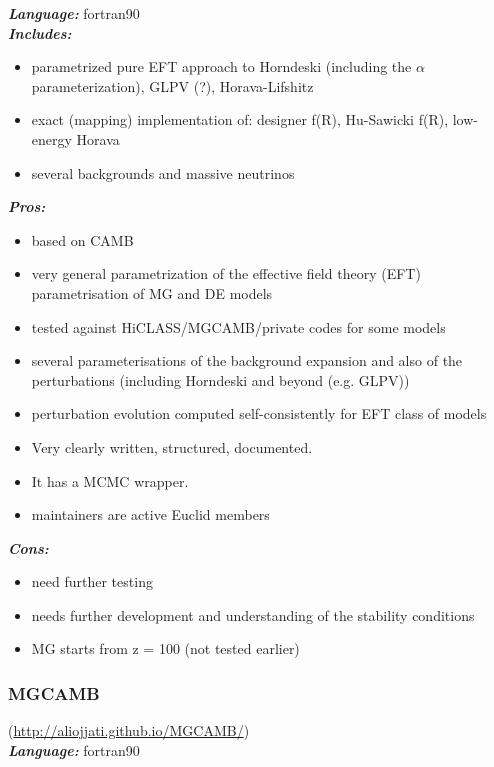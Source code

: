 {\it \bf Language:} fortran90\\

{\it \bf Includes:}\\
\begin{itemize}
\item parametrized pure EFT approach to Horndeski (including the $\alpha$ parameterization), GLPV (?), 
      Horava-Lifshitz 
\item exact (mapping) implementation of: designer f(R), Hu-Sawicki f(R), low-energy Horava
\item several backgrounds and massive neutrinos
\end{itemize}


{\it \bf Pros:}
\begin{itemize}
 \item based on CAMB
 \item very general parametrization of the effective field theory (EFT) parametrisation of MG and DE models
 \item tested against HiCLASS/MGCAMB/private codes for some models
 \item several parameterisations of the background expansion and also of the perturbations (including Horndeski and beyond (e.g. GLPV))
 \item perturbation evolution computed self-consistently for EFT class of models
 \item Very clearly written, structured, documented. 
 \item It has a MCMC wrapper.
 \item maintainers are active Euclid members
\end{itemize}

{\it \bf Cons: }
\begin{itemize}
 \item need further testing
 \item needs further development and understanding of the stability conditions
 \item MG starts from z = 100 (not tested earlier)
\end{itemize}

\newpage
\subsubsection{MGCAMB}(\url{http://aliojjati.github.io/MGCAMB/})\\

{\it \bf Language:} fortran90\\

